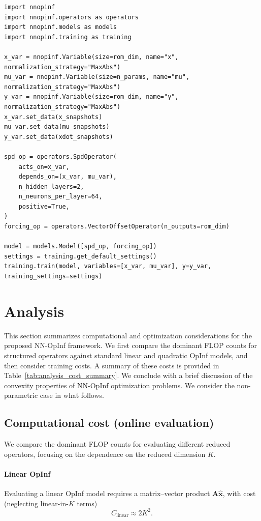 \documentclass[3p,computermodern,11pt]{elsarticle}
\numberwithin{equation}{section}
\newcommand{\reducedState}{\hat{\state}}
\newcommand{\state}{\boldsymbol x}
\newcommand{\romDim}{K}
\begin{document}
\begin{lstlisting}[style=nnopinf]
import nnopinf
import nnopinf.operators as operators
import nnopinf.models as models
import nnopinf.training as training

x_var = nnopinf.Variable(size=rom_dim, name="x", normalization_strategy="MaxAbs")
mu_var = nnopinf.Variable(size=n_params, name="mu", normalization_strategy="MaxAbs")
y_var = nnopinf.Variable(size=rom_dim, name="y", normalization_strategy="MaxAbs")
x_var.set_data(x_snapshots)
mu_var.set_data(mu_snapshots)
y_var.set_data(xdot_snapshots)

spd_op = operators.SpdOperator(
    acts_on=x_var,
    depends_on=(x_var, mu_var),
    n_hidden_layers=2,
    n_neurons_per_layer=64,
    positive=True,
)
forcing_op = operators.VectorOffsetOperator(n_outputs=rom_dim)

model = models.Model([spd_op, forcing_op])
settings = training.get_default_settings()
training.train(model, variables=[x_var, mu_var], y=y_var, training_settings=settings)
\end{lstlisting}

\section{Analysis}\label{sec:analysis}
This section summarizes computational and optimization considerations for the proposed NN-OpInf framework. We first compare the dominant FLOP counts for structured operators against standard linear and quadratic OpInf models, and then consider training costs. A summary of these costs is provided in Table~\ref{tab:analysis_cost_summary}.  We conclude with a brief discussion of the convexity properties of NN-OpInf optimization problems. We consider the non-parametric case in what follows.

\subsection{Computational cost (online evaluation)}
We compare the dominant FLOP counts for evaluating different reduced operators, focusing on the dependence on the reduced dimension $\romDim$. 

\paragraph{Linear OpInf}
Evaluating a linear OpInf model requires a matrix--vector product $\mathbf{A}\reducedState$, with cost (neglecting linear-in-$K$ terms)
$$C_{\mathrm{linear}} \approx  2\romDim^2 .$$
\end{document}
